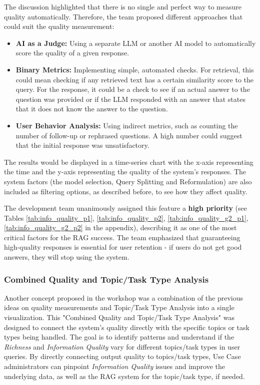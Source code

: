 \documentclass[
	english,
	ruledheaders=section,%
	class=report,%
	thesis={type=bachelor},%
	accentcolor=1b,%
	custommargins=true,%
	marginpar=false,%
	parskip=half-,%
	fontsize=11pt,%
	DIV=14,
]{tudapub}
\begin{document}
The discussion highlighted that there is no single and perfect way to measure quality automatically. Therefore, the team proposed different approaches that could suit the quality measurement:

\begin{itemize}
    \item \textbf{AI as a Judge:} Using a separate LLM or another AI model to automatically score the quality of a given response.
    \item \textbf{Binary Metrics:} Implementing simple, automated checks. For retrieval, this could mean checking if any retrieved text has a certain similarity score to the query. For the response, it could be a check to see if an actual answer to the question was provided or if the LLM responded with an answer that states that it does not know the answer to the question.
    \item \textbf{User Behavior Analysis:} Using indirect metrics, such as counting the number of follow-up or rephrased questions. A high number could suggest that the initial response was unsatisfactory.
\end{itemize}

The results would be displayed in a time-series chart with the x-axis representing the time and the y-axis representing the quality of the system's responses. The system factors (the model selection, Query Splitting and Reformulation) are also included as filtering options, as described before, to see how they affect quality.

The development team unanimously assigned this feature a \textbf{high priority} (see Tables \ref{tab:info_quality_p1}, \ref{tab:info_quality_p2}, \ref{tab:info_quality_g2_p1}, \ref{tab:info_quality_g2_p2} in the appendix), describing it as one of the most critical factors for the RAG success. The team emphasized that guaranteeing high-quality responses is essential for user retention - if users do not get good answers, they will stop using the system.
\subsubsection{Combined Quality and Topic/Task Type Analysis}
Another concept proposed in the workshop was a combination of the previous ideas on quality measurements and Topic/Task Type Analysis into a single visualization. This "Combined Quality and Topic/Task Type Analysis" was designed to connect the system's quality directly with the specific topics or task types being handled. The goal is to identify patterns and understand if the \textit{Richness} and \textit{Information Quality} \parencite[pp.~57--58]{Jennex2006} vary for different topics/task types in user queries. By directly connecting output quality to topics/task types, Use Case administrators can pinpoint \textit{Information Quality} issues and improve the underlying data, as well as the RAG system for the topic/task type, if needed.
\end{document}
